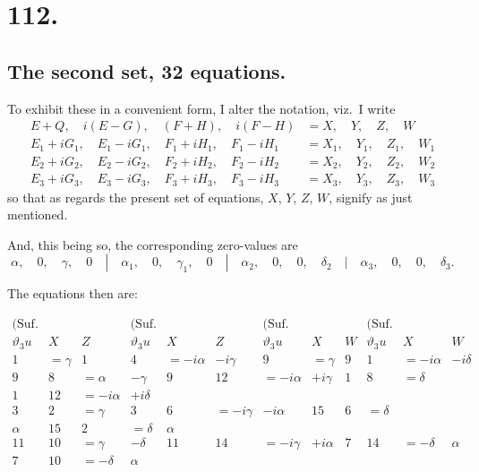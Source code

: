 \documentclass[11pt,a4paper]{article}
\newcommand{\uth}[1]{\vartheta_{#1}}
\begin{document}
\newpage
\section*{112.}
\label{sec:112}

\subsection*{The second set, 32 equations.}

To exhibit these in a convenient form, I alter the notation, viz.\ I write
\begin{align*}
E+Q, \quad i(E-G), \quad (F+H), \quad i(F-H) &= X, \quad Y, \quad Z, \quad W \\
E_1+iG_1, \quad E_1-iG_1, \quad F_1+iH_1, \quad F_1-iH_1 &= X_1, \quad Y_1, \quad Z_1, \quad W_1 \\
E_2+iG_2, \quad E_2-iG_2, \quad F_2+iH_2, \quad F_2-iH_2 &= X_2, \quad Y_2, \quad Z_2, \quad W_2 \\
E_3+iG_3, \quad E_3-iG_3, \quad F_3+iH_3, \quad F_3-iH_3 &= X_3, \quad Y_3, \quad Z_3, \quad W_3
\end{align*}
so that as regards the present set of equations, $X$, $Y$, $Z$, $W$, signify as just mentioned.

And, this being so, the corresponding zero-values are
\[
\alpha, \quad 0, \quad \gamma, \quad 0 \quad|\quad \alpha_1, \quad 0, \quad \gamma_1, \quad 0 \quad|\quad \alpha_2, \quad 0, \quad 0, \quad \delta_2 \quad|\quad \alpha_3, \quad 0, \quad 0, \quad \delta_3.
\]

The equations then are:

\[
\begin{array}{c|cc|c|cc|c|cc|c|cc}
\text{(Suf. 0)} & & & \text{(Suf. 1)} & & & \text{(Suf. 2)} & & & \text{(Suf. 3)} & & \\
\hline
\uth{3}u & X & Z & \uth{3}u & X & Z & \uth{3}u & X & W & \uth{3}u & X & W \\
\hline
1 & = \gamma & 1 & 4 & = -i\alpha & -i\gamma & 9 & = \gamma & 9 & 1 & = -i\alpha & -i\delta \\
9 & 8 & = \alpha & -\gamma & 9 & 12 & = -i\alpha & +i\gamma & 1 & 8 & = \delta \\
1 & 12 & = -i\alpha & +i\delta \\
3 & 2 & = \gamma & 3 & 6 & = -i\gamma & -i\alpha & 15 & 6 & = \delta \\
\alpha & 15 & 2 & = \delta & \alpha \\
11 & 10 & = \gamma & -\delta & 11 & 14 & = -i\gamma & +i\alpha & 7 & 14 & = -\delta & \alpha \\
7 & 10 & = -\delta & \alpha
\end{array}
\]
\end{document}
